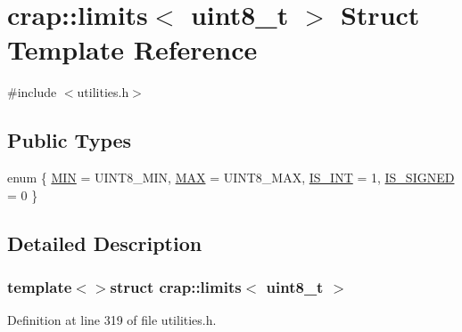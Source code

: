 \hypertarget{structcrap_1_1limits_3_01uint8__t_01_4}{\section{crap\+:\+:limits$<$ uint8\+\_\+t $>$ Struct Template Reference}
\label{structcrap_1_1limits_3_01uint8__t_01_4}
}


{\ttfamily \#include $<$utilities.\+h$>$}

\subsection*{Public Types}
\begin{DoxyCompactItemize}
\item 
enum \{ \hyperlink{structcrap_1_1limits_3_01uint8__t_01_4_a8ab9ce8c8fe0fd07af1397224a12fe54a4a83b22dae2ce09dd72bf5cb29687118}{M\+I\+N} = U\+I\+N\+T8\+\_\+\+M\+I\+N, 
\hyperlink{structcrap_1_1limits_3_01uint8__t_01_4_a8ab9ce8c8fe0fd07af1397224a12fe54a782ec620bbe79358c648f5a6784338f2}{M\+A\+X} = U\+I\+N\+T8\+\_\+\+M\+A\+X, 
\hyperlink{structcrap_1_1limits_3_01uint8__t_01_4_a8ab9ce8c8fe0fd07af1397224a12fe54ab6923c8e2e67eb18afa6948d4af638a3}{I\+S\+\_\+\+I\+N\+T} = 1, 
\hyperlink{structcrap_1_1limits_3_01uint8__t_01_4_a8ab9ce8c8fe0fd07af1397224a12fe54a31ea108f27c14dd7936d14e0bbfaf293}{I\+S\+\_\+\+S\+I\+G\+N\+E\+D} = 0
 \}
\end{DoxyCompactItemize}


\subsection{Detailed Description}
\subsubsection*{template$<$$>$struct crap\+::limits$<$ uint8\+\_\+t $>$}



Definition at line 319 of file utilities.\+h.




